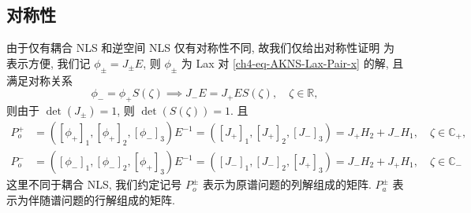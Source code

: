\subsection{对称性}
由于仅有耦合 NLS 和逆空间 NLS 仅有对称性不同, 故我们仅给出对称性证明
为表示方便, 我们记 $\phi_{\pm} = J_{\pm} E$, 则 $\phi_{\pm}$ 为 Lax 对 \eqref{ch4-eq-AKNS-Lax-Pair-x} 的解, 且满足对称关系
\begin{equation}
    \phi_{-} = \phi_{+} S(\zeta) \implies J_{-} E = J_{+} E S(\zeta), \quad \zeta \in \mathbb{R},
\end{equation}
则由于 $\det(J_{\pm}) = 1$, 则 $\det(S(\zeta)) = 1$. 且
\begin{align}
    P_{o}^{+} & = ([\phi_{+}]_{1}, [\phi_{+}]_{2}, [\phi_{-}]_{3}) E^{-1} = ([J_{+}]_{1}, [J_{+}]_{2}, [J_{-}]_{3}) = J_{+} H_{2} + J_{-} H_{1}, \quad \zeta \in \mathbb{C}_{+}, \\
    P_{o}^{-} & = ([\phi_{-}]_{1}, [\phi_{-}]_{2}, [\phi_{+}]_{3}) E^{-1} = ([J_{-}]_{1}, [J_{-}]_{2}, [J_{+}]_{3}) = J_{-} H_{2} + J_{+} H_{1}, \quad \zeta \in \mathbb{C}_{-}
\end{align}
这里不同于耦合 NLS, 我们约定记号 $P_{o}^{\pm}$ 表示为原谱问题的列解组成的矩阵. $P_{a}^{\pm}$ 表示为伴随谱问题的行解组成的矩阵.

